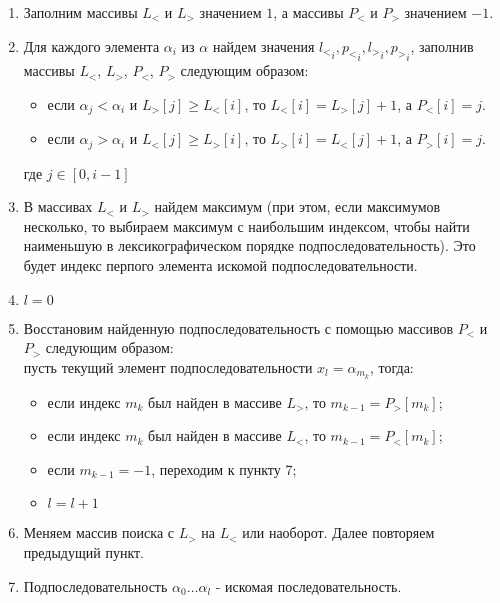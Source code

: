 \documentclass[12pt]{article}
\begin{document}
\begin{enumerate}

\item Заполним массивы $L_<$ и $L_>$ значением $1$, а массивы $P_<$ и $P_>$ значением $-1$.

\item Для каждого элемента $\alpha_i$ из $\alpha$ найдем значения ${l_<}_i,{p_<}_i,{l_>}_i,{p_>}_i$, заполнив массивы $L_<$, $L_>$, $P_<$, $P_>$ следующим образом:

	\begin{itemize}
	
	\item если $ \alpha_j < \alpha_i $ и $ L_>[j] \ge L_<[i] $, то $ L_<[i] = L_>[j] + 1 $, а $ P_<[i] = j $.

	\item если $ \alpha_j > \alpha_i $ и $ L_<[j] \ge L_>[i] $, то $ L_>[i] = L_<[j] + 1 $, а $ P_>[i] = j $.
	\end{itemize}
	где $j \in [0, i-1]$	

\item В массивах $ L_< $ и $ L_> $ найдем максимум (при этом, если максимумов несколько, то выбираем максимум с наибольшим индексом, чтобы найти наименьшую в лексикографическом порядке подпоследовательность). Это будет индекс перпого элемента искомой подпоследовательности.

\item $l = 0$

\item Восстановим найденную подпоследовательность с помощью массивов $P_<$ и $P_>$ следующим образом:\\
пусть текущий элемент подпоследовательности $x_l = \alpha_{m_k}$, тогда:
	\begin{itemize}
	
	\item если индекс ${m_k}$ был найден в массиве $L_>$, то $m_{k-1} = P_>[m_k]$;

	\item если индекс ${m_k}$ был найден в массиве $L_<$, то $m_{k-1} = P_<[m_k]$;
	
	\item если $m_{k-1} = -1$, переходим к пункту 7;
	
	\item $l = l + 1$
	
	\end{itemize}
	
\item Меняем массив поиска с $L_>$ на $L_<$ или наоборот. Далее повторяем предыдущий пункт.
	
\item Подпоследовательность $\alpha_0\dots\alpha_l$ - искомая последовательность.
	
\end{enumerate}
	
\end{document}
